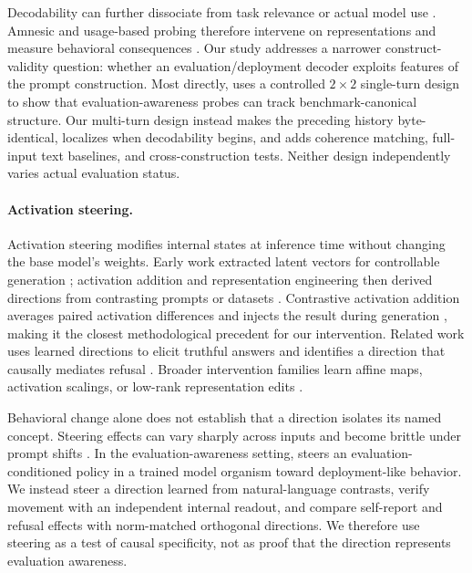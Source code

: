 \documentclass{article}
\begin{document}
Decodability can further dissociate from task relevance or actual model use
\citep{ravichander2021probing}. Amnesic and usage-based probing therefore
intervene on representations and measure behavioral consequences
\citep{elazar2021amnesic,lasri2022usage}. Our study addresses a narrower
construct-validity question: whether an evaluation/deployment decoder exploits
features of the prompt construction. Most directly, \citet{devbunova2026format}
uses a controlled $2\!\times\!2$ single-turn design to show that
evaluation-awareness probes can track benchmark-canonical structure. Our
multi-turn design instead makes the preceding history byte-identical, localizes
when decodability begins, and adds coherence matching, full-input text
baselines, and cross-construction tests. Neither design independently varies
actual evaluation status.

\paragraph{Activation steering.}
Activation steering modifies internal states at inference time without changing
the base model's weights. Early work extracted latent vectors for controllable
generation \citep{subramani2022extracting}; activation addition and
representation engineering then derived directions from contrasting prompts or
datasets \citep{turner2023steering,zou2023representation}. Contrastive
activation addition averages paired activation differences and injects the
result during generation \citep{rimsky2024steering}, making it the closest
methodological precedent for our intervention. Related work uses learned
directions to elicit truthful answers \citep{li2023inference} and identifies a
direction that causally mediates refusal \citep{arditi2024refusal}. Broader
intervention families learn affine maps, activation scalings, or low-rank
representation edits \citep{singh2024representation,stoehr2024activation,
wu2024reft}.

Behavioral change alone does not establish that a direction isolates its named
concept. Steering effects can vary sharply across inputs and become brittle
under prompt shifts \citep{tan2024analysing}. In the evaluation-awareness
setting, \citet{hua2025steering} steers an evaluation-conditioned policy in a
trained model organism toward deployment-like behavior. We instead steer a
direction learned from natural-language contrasts, verify movement with an
independent internal readout, and compare self-report and refusal effects with
norm-matched orthogonal directions. We therefore use steering as a test of
causal specificity, not as proof that the direction represents evaluation
awareness.
\end{document}
